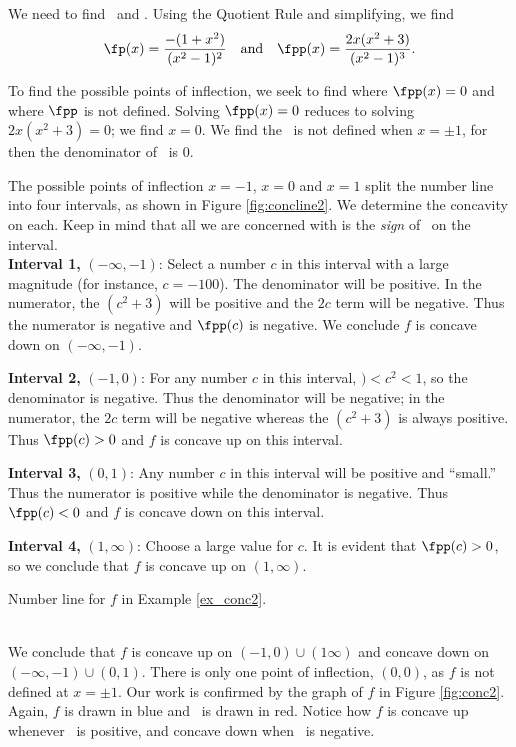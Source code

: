 {We need to find \fp\ and \fpp. Using the Quotient Rule and simplifying, we find
$$\fp(x)=\frac{-(1+x^2)}{(x^2-1)^2} \quad \text{and}\quad \fpp(x) = \frac{2x(x^2+3)}{(x^2-1)^3}.$$

To find the possible points of inflection, we seek to find where $\fpp(x)=0$ and where $\fpp$ is not defined. Solving $\fpp(x)=0$ reduces to solving $2x(x^2+3)=0$; we find $x=0$.  We find the \fpp\ is not defined when $x=\pm 1$, for then the denominator of \fpp\ is 0. 

The possible points of inflection $x=-1$, $x=0$ and $x=1$ split the number line into four intervals, as shown in Figure \ref{fig:concline2}. We determine the concavity on each. Keep in mind that all we are concerned with is the \textit{sign} of \fpp\ on the interval.\\

\noindent\textbf{Interval 1,} $(-\infty,-1)$: Select a number $c$ in this interval with a large magnitude (for instance, $c=-100$). The denominator will be positive. In the numerator, the $(c^2+3)$ will be positive and the $2c$ term will be negative. Thus the numerator is negative and $\fpp(c)$ is negative. We conclude $f$ is concave down on $(-\infty,-1)$.

\noindent\textbf{Interval 2,} $(-1,0)$: For any number $c$ in this interval, $)<c^2<1$, so the denominator is negative. Thus the denominator will be negative; in the numerator, the $2c$ term will be negative whereas the $(c^2+3)$ is always positive. Thus $\fpp(c)>0$ and $f$ is concave up on this interval.

\noindent\textbf{Interval 3,} $(0,1)$: Any number $c$ in this interval will be positive and ``small.'' Thus the numerator is positive while the denominator is negative. Thus $\fpp(c)<0$ and $f$ is concave down on this interval.

\noindent\textbf{Interval 4,} $(1,\infty)$: Choose a large value for $c$. It is evident that $\fpp(c)>0$, so we conclude that $f$ is concave up on $(1,\infty)$.


\noindent\begin{minipage}{\textwidth}\centering
{}
\captionsetup{type=figure}%
\caption{Number line for $f$ in Example \ref{ex_conc2}.}\label{fig:concline2}
\end{minipage}\\

We conclude that $f$ is concave up on $(-1,0)\cup(1\infty)$ and concave down on $(-\infty,-1)\cup(0,1)$. There is only one point of inflection, $(0,0)$, as $f$ is not defined at $x=\pm 1$. Our work is confirmed by the graph of $f$ in Figure \ref{fig:conc2}. Again, $f$ is drawn in blue and \fpp\ is drawn in red. Notice how $f$ is concave up whenever \fpp\ is positive, and concave down when \fpp\ is negative.
}\\

